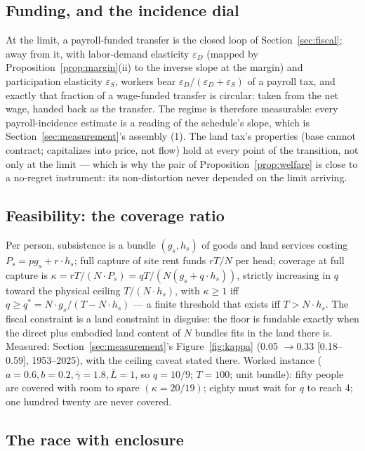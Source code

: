 \documentclass[12pt]{article}
\theoremstyle{plain}
\begin{document}
\subsection{Funding, and the incidence dial}\label{app:funding}

At the limit, a payroll-funded transfer is the closed loop of Section~\ref{sec:fiscal}; away from it, with labor-demand elasticity $\varepsilon _D$ (mapped by Proposition~\ref{prop:margin}(ii) to the inverse slope at the margin) and participation elasticity $\varepsilon _S$, workers bear $\varepsilon _D/(\varepsilon _D+\varepsilon _S)$ of a payroll tax, and exactly that fraction of a wage-funded transfer is circular: taken from the net wage, handed back as the transfer. The regime is therefore measurable: every payroll-incidence estimate is a reading of the schedule's slope, which is Section~\ref{sec:measurement}'s assembly (1). The land tax's properties (base cannot contract; capitalizes into price, not flow) hold at every point of the transition, not only at the limit --- which is why the pair of Proposition~\ref{prop:welfare} is close to a no-regret instrument: its non-distortion never depended on the limit arriving.

\subsection{Feasibility: the coverage ratio}\label{app:coverage}

Per person, subsistence is a bundle $(g_s, h_s)$ of goods and land services costing $P_s = p g_s + r\cdot h_s$; full capture of site rent funds $rT/N$ per head; coverage at full capture is $\kappa = rT/(N\cdot P_s) = qT/(N(g_s + q\cdot h_s))$, strictly increasing in $q$ toward the physical ceiling $T/(N\cdot h_s)$, with $\kappa \ge 1$ iff $q \ge q^* = N\cdot g_s/(T - N\cdot h_s)$ --- a finite threshold that exists iff $T > N\cdot h_s$. The fiscal constraint is a land constraint in disguise: the floor is fundable exactly when the direct plus embodied land content of $N$ bundles fits in the land there is. Measured: Section~\ref{sec:measurement}'s Figure~\ref{fig:kappa} (0.05 $\to 0.33$ [0.18--0.59], 1953--2025), with the ceiling caveat stated there. Worked instance ($a = 0.6, b = 0.2, \bar{\gamma} = 1.8, \bar{L} = 1$, so $q = 10/9$; $T = 100$; unit bundle): fifty people are covered with room to spare $(\kappa = 20/19)$; eighty must wait for $q$ to reach 4; one hundred twenty are never covered.

\subsection{The race with enclosure}\label{app:race}
\end{document}
